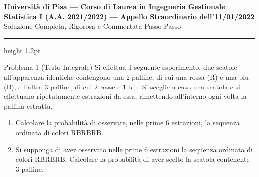 \documentclass[11pt,a4paper]{article}
\begin{document}
\begin{center}
    {\LARGE\bfseries\color{navyblue} Università di Pisa --- Corso di Laurea in Ingegneria Gestionale}\\[0.4em]
    {\Large\bfseries Statistica I (A.A. 2021/2022) --- Appello Straordinario dell'11/01/2022}\\[0.3em]
    {\large\textsf{Soluzione Completa, Rigorosa e Commentata Passo-Passo}}
\end{center}
\vspace{0.5em}
\hrule height 1.2pt
\vspace{1.5em}

\begin{problemabox}{Problema 1 (Testo Integrale)}
Si effettua il seguente esperimento: due scatole all'apparenza identiche contengono una $2$ palline, di cui una rossa (R) e una blu (B), e l'altra $3$ palline, di cui $2$ rosse e $1$ blu. Si sceglie a caso una scatola e si effettuano ripetutamente estrazioni da essa, rimettendo all'interno ogni volta la pallina estratta.
\begin{enumerate}
    \item Calcolare la probabilità di osservare, nelle prime 6 estrazioni, la sequenza ordinata di colori RBRBRB.
    \item Si supponga di aver osservato nelle prime 6 estrazioni la sequenza ordinata di colori RBRBRB. Calcolare la probabilità di aver scelto la scatola contenente 3 palline.
\end{enumerate}
\end{problemabox}
\end{document}

